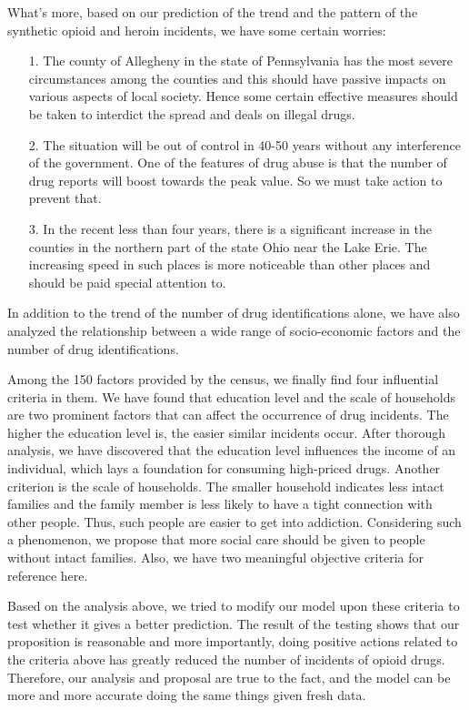 \documentclass{mcmthesis}
\begin{document}
What’s more, based on our prediction of the trend and the pattern of the synthetic opioid and heroin incidents, we have some certain worries:
\begin{itemize}
	\item[1. ] The county of Allegheny in the state of Pennsylvania has the most severe circumstances among the counties and this should have passive impacts on various aspects of local society. Hence some certain effective measures should be taken to interdict the spread and deals on illegal drugs.
	\item[2. ] The situation will be out of control in 40-50 years without any interference of the government. One of the features of drug abuse is that the number of drug reports will boost towards the peak value. So we must take action to prevent that.
	\item[3. ] In the recent less than four years, there is a significant increase in the counties in the northern part of the state Ohio near the Lake Erie. The increasing speed in such places is more noticeable than other places and should be paid special attention to.
\end{itemize}

In addition to the trend of the number of drug identifications alone, we have also analyzed the relationship between a wide range of socio-economic factors and the number of drug identifications. 

Among the 150 factors provided by the census, we finally find four influential criteria in them. We have found that education level and the scale of households are two prominent factors that can affect the occurrence of drug incidents. The higher the education level is, the easier similar incidents occur. After thorough analysis, we have discovered that the education level influences the income of an individual, which lays a foundation for consuming high-priced drugs. Another criterion is the scale of households. The smaller household indicates less intact families and the family member is less likely to have a tight connection with other people. Thus, such people are easier to get into addiction. Considering such a phenomenon, we propose that more social care should be given to people without intact families. Also, we have two meaningful objective criteria for reference here.

Based on the analysis above, we tried to modify our model upon these criteria to test whether it gives a better prediction. The result of the testing shows that our proposition is reasonable and more importantly, doing positive actions related to the criteria above has greatly reduced the number of incidents of opioid drugs. Therefore, our analysis and proposal are true to the fact, and the model can be more and more accurate doing the same things given fresh data.
\end{document}
